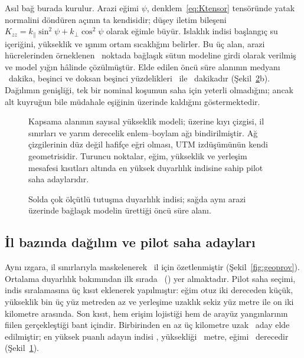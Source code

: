 \documentclass[11pt,a4paper]{article}
\begin{document}
Asıl bağ burada kurulur. Arazi eğimi $\psi$, denklem~\eqref{eq:Ktensor}
tensöründe yatak normalini döndüren açının ta kendisidir; düşey iletim bileşeni
$K_{zz} = k_\parallel\sin^2\psi + k_\perp\cos^2\psi$ olarak eğimle
büyür. Islaklık indisi başlangıç su içeriğini, yükseklik ve ışınım ortam
sıcaklığını belirler. Bu üç alan, arazi hücrelerinden örneklenen \geoCells\
noktada bağlaşık sütun modeline girdi olarak verilmiş ve model yığın hâlinde
çözülmüştür. Elde edilen öncü süre alanının medyanı \geoLeadMed~dakika,
beşinci ve doksan beşinci yüzdelikleri \geoLeadPfive\ ile \geoLeadPnf~dakikadır
(Şekil~\ref{fig:georisk}b). Dağılımın genişliği, tek bir nominal koşumun
saha için yeterli olmadığını; ancak alt kuyruğun bile müdahale eşiğinin
üzerinde kaldığını göstermektedir.

\begin{figure}[htbp]\centering

\caption{Kapsama alanının sayısal yükseklik modeli; üzerine kıyı çizgisi, il
sınırları ve yarım derecelik enlem--boylam ağı bindirilmiştir. Ağ çizgilerinin
düz değil hafifçe eğri olması, UTM izdüşümünün kendi geometrisidir. Turuncu
noktalar, eğim, yükseklik ve yerleşim mesafesi kısıtları altında en yüksek
duyarlılık indisine sahip pilot saha adaylarıdır.}
\label{fig:geomap}
\end{figure}

\begin{figure}[htbp]\centering

\caption{Solda çok ölçütlü tutuşma duyarlılık indisi; sağda aynı arazi
üzerinde bağlaşık modelin ürettiği öncü süre alanı.}
\label{fig:georisk}
\end{figure}

\subsection{İl bazında dağılım ve pilot saha adayları}

Aynı ızgara, il sınırlarıyla maskelenerek \geoNprov\ il için özetlenmiştir
(Şekil~\ref{fig:geoprov}). Ortalama duyarlılık bakımından ilk sırada
\geoTopProv\ (\geoTopRisk) yer almaktadır. Pilot saha seçimi, indis
sıralamasına üç kısıt eklenerek yapılmıştır: eğim otuz iki dereceden küçük,
yükseklik bin üç yüz metreden az ve yerleşime uzaklık sekiz yüz metre ile on
iki kilometre arasında. Son kısıt, hem erişim lojistiği hem de arayüz
yangınlarının fiilen gerçekleştiği bant içindir. Birbirinden en az üç
kilometre uzak \geoSiteN\ aday elde edilmiştir; en yüksek puanlı adayın indisi
\geoSiteRisk, yüksekliği \geoSiteElev~metre, eğimi \geoSiteSlope\ derecedir
(Şekil~\ref{fig:geomap}).
\end{document}
